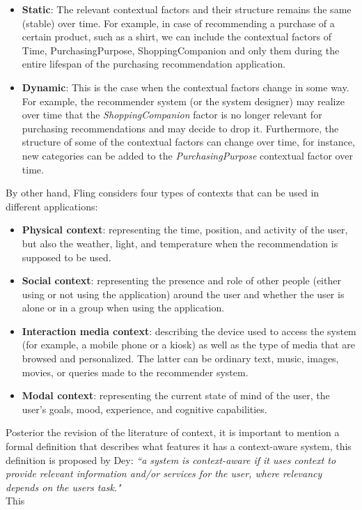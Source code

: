 	\begin{itemize}
	\item \textbf{Static}: The relevant contextual factors and their structure
	remains the same (stable) over time. For example, in case of recommending a
	purchase of a certain product, such as a shirt, we can include the
	contextual factors of Time, PurchasingPurpose, ShoppingCompanion and only
	them during the entire lifespan of the purchasing recommendation
	application.
	\item \textbf {Dynamic}: This is the case when the contextual factors 
	change in some way. For example, the recommender system (or the 
	system designer) may realize over time that the \textit{ShoppingCompanion} 
	factor is no longer relevant for purchasing recommendations and may 
	decide to drop it. Furthermore, the structure of some of the contextual
	factors can change over time, for instance, new categories can be
	added to the \textit{PurchasingPurpose} contextual factor over time.
	\end{itemize}
By other hand, Fling\cite{fling2009mobile} considers four types of
contexts that can be used in different applications:  
\begin{itemize}  
\item \textbf{Physical context}: representing the time, position, and
activity of the user, but also the weather, light, and temperature
when the recommendation is supposed to be used.  
\item \textbf{Social context}: representing the presence and role 
of other people (either using or not using the application) around 
the user and whether the user is alone or in a group when using 
the application. 
\item \textbf{Interaction media context}: describing the device used to
access the system (for example, a mobile phone or a kiosk) as well as
the type of media that are browsed and personalized. The latter can be
ordinary text, music, images, movies, or queries made to the
recommender system.  
\item \textbf{Modal context}: representing the current state 
of mind of the user,  the user's goals, mood, experience, 
and cognitive capabilities. 
\end{itemize} 
Posterior the revision of the literature of context, it is important
to mention a formal definition that describes what features it has a
context-aware system, this definition is proposed by
Dey\cite{dey2001understanding}: \textit{``a system is context-aware if
it uses context to provide relevant information and/or services for
the user, where relevancy  depends on the users task."}\\ This

